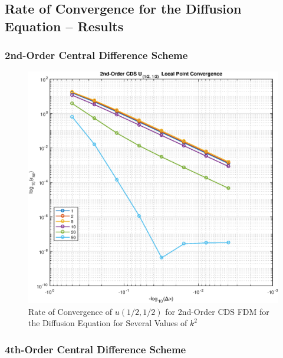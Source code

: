 \documentclass[10pt]{article}		%
\numberwithin{equation}{section}
\begin{document}
\begin{table}[H]
	
\end{table}

\newpage

\subsection{Rate of Convergence for the Diffusion Equation -- Results}

\subsubsection{2nd-Order Central Difference Scheme}

\begin{figure}[H]
	\begin{center}
				\includegraphics[width = 0.8\linewidth]{minus_order_2_u_avg}
		\caption{Rate of Convergence of $u(1/2, 1/2)$ for 2nd-Order CDS FDM for the Diffusion Equation for Several Values of $k^2$}	
	\end{center}
\end{figure}

\begin{table}[H]
		
\end{table}

\newpage

\subsubsection{4th-Order Central Difference Scheme}
\end{document}
